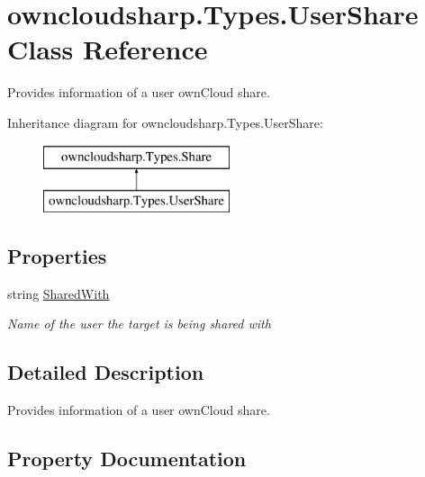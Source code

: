 \hypertarget{classowncloudsharp_1_1_types_1_1_user_share}{}\section{owncloudsharp.\+Types.\+User\+Share Class Reference}
\label{classowncloudsharp_1_1_types_1_1_user_share}


Provides information of a user own\+Cloud share.  


Inheritance diagram for owncloudsharp.\+Types.\+User\+Share\+:\begin{figure}[H]
\begin{center}
\leavevmode
\includegraphics[height=2.000000cm]{classowncloudsharp_1_1_types_1_1_user_share}
\end{center}
\end{figure}
\subsection*{Properties}
\begin{DoxyCompactItemize}
\item 
string \hyperlink{classowncloudsharp_1_1_types_1_1_user_share_a1d253a1b33f697479bf7a14f4b78bb4e}{Shared\+With}
\begin{DoxyCompactList}\small\item\em Name of the user the target is being shared with \end{DoxyCompactList}\end{DoxyCompactItemize}


\subsection{Detailed Description}
Provides information of a user own\+Cloud share. 



\subsection{Property Documentation}
\mbox{\label{classowncloudsharp_1_1_types_1_1_user_share_a1d253a1b33f697479bf7a14f4b78bb4e}} 

